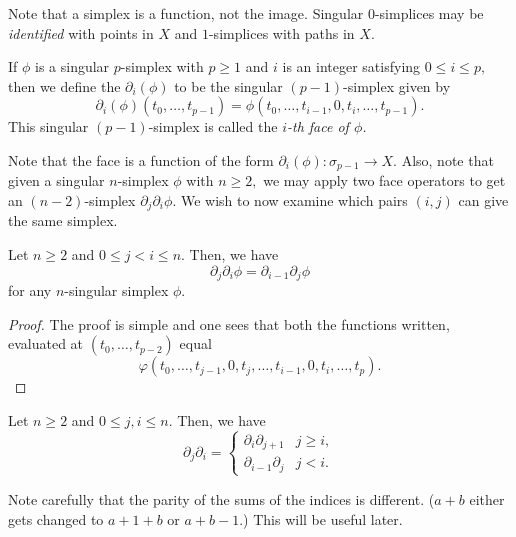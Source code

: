\documentclass[12pt]{article}
\begin{document}
Note that a simplex is a function, not the image. Singular $0$-simplices may be \emph{identified} with points in $X$ and $1$-simplices with paths in $X.$

\begin{defn}
	If $\phi$ is a singular $p$-simplex with $p \ge 1$ and $i$ is an integer satisfying $0 \le i \le p,$ then we define the $\partial_i(\phi)$ to be the singular $(p - 1)$-simplex given by
	\begin{equation*} 
		\partial_i(\phi)(t_0, \ldots, t_{p-1}) = \phi(t_0, \ldots, t_{i-1}, 0, t_{i}, \ldots, t_{p-1}).
	\end{equation*}
	This singular $(p - 1)$-simplex is called the \emph{$i$-th face of $\phi$.}
\end{defn}
Note that the face is a function of the form $\partial_i(\phi):\sigma_{p-1}\to X.$
Also, note that given a singular $n$-simplex $\phi$ with $n \ge 2,$ we may apply two face operators to get an $(n-2)$-simplex $\partial_j\partial_i\phi.$ We wish to now examine which pairs $(i, j)$ can give the same simplex.

\begin{prop} 
	Let $n \ge 2$ and $0 \le j < i \le n.$ Then, we have
	\begin{equation*} 
		\partial_j\partial_i\phi = \partial_{i-1}\partial_j\phi
	\end{equation*}
	for any $n$-singular simplex $\phi.$
\end{prop}
\begin{proof} 
	The proof is simple and one sees that both the functions written, evaluated at $(t_0, \ldots, t_{p-2})$ equal
	\begin{equation*} 
		\varphi(t_0, \ldots, t_{j-1}, 0, t_{j}, \ldots, t_{i-1}, 0, t_{i}, \ldots, t_p).
	\end{equation*}
\end{proof}

\begin{cor} \label{cor:sameface}
	Let $n \ge 2$ and $0 \le j, i \le n.$ Then, we have
	\begin{equation*} 
		\partial_j\partial_i = \begin{cases}
			\partial_i\partial_{j+1} & j \ge i,\\
			\partial_{i-1}\partial_j & j < i.
		\end{cases}
	\end{equation*}
\end{cor}
Note carefully that the parity of the sums of the indices is different. ($a+b$ either gets changed to $a+1+b$ or $a+b-1.$) This will be useful later.
\end{document}
